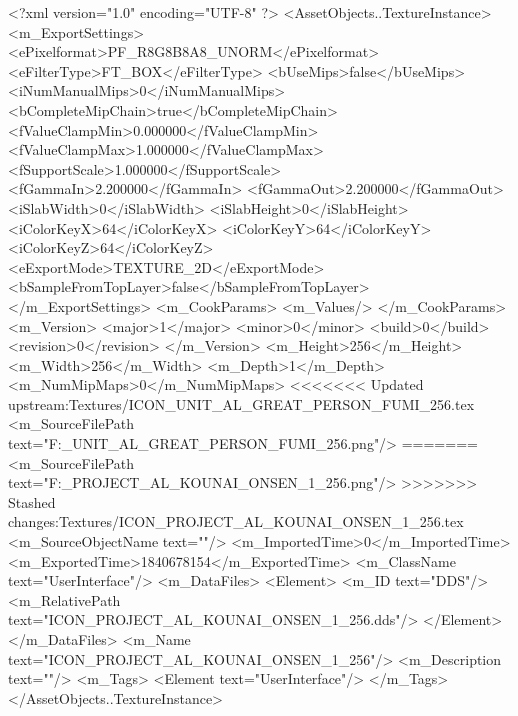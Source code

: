 <?xml version="1.0" encoding="UTF-8" ?>
<AssetObjects..TextureInstance>
	<m_ExportSettings>
		<ePixelformat>PF_R8G8B8A8_UNORM</ePixelformat>
		<eFilterType>FT_BOX</eFilterType>
		<bUseMips>false</bUseMips>
		<iNumManualMips>0</iNumManualMips>
		<bCompleteMipChain>true</bCompleteMipChain>
		<fValueClampMin>0.000000</fValueClampMin>
		<fValueClampMax>1.000000</fValueClampMax>
		<fSupportScale>1.000000</fSupportScale>
		<fGammaIn>2.200000</fGammaIn>
		<fGammaOut>2.200000</fGammaOut>
		<iSlabWidth>0</iSlabWidth>
		<iSlabHeight>0</iSlabHeight>
		<iColorKeyX>64</iColorKeyX>
		<iColorKeyY>64</iColorKeyY>
		<iColorKeyZ>64</iColorKeyZ>
		<eExportMode>TEXTURE_2D</eExportMode>
		<bSampleFromTopLayer>false</bSampleFromTopLayer>
	</m_ExportSettings>
	<m_CookParams>
		<m_Values/>
	</m_CookParams>
	<m_Version>
		<major>1</major>
		<minor>0</minor>
		<build>0</build>
		<revision>0</revision>
	</m_Version>
	<m_Height>256</m_Height>
	<m_Width>256</m_Width>
	<m_Depth>1</m_Depth>
	<m_NumMipMaps>0</m_NumMipMaps>
<<<<<<< Updated upstream:Textures/ICON_UNIT_AL_GREAT_PERSON_FUMI_256.tex
	<m_SourceFilePath text="F:\DT\lilyimages\gpportrait\ICON_UNIT_AL_GREAT_PERSON_FUMI_256.png"/>
=======
	<m_SourceFilePath text="F:\DT\lilyimages\projects\ICON_PROJECT_AL_KOUNAI_ONSEN_1_256.png"/>
>>>>>>> Stashed changes:Textures/ICON_PROJECT_AL_KOUNAI_ONSEN_1_256.tex
	<m_SourceObjectName text=""/>
	<m_ImportedTime>0</m_ImportedTime>
	<m_ExportedTime>1840678154</m_ExportedTime>
	<m_ClassName text="UserInterface"/>
	<m_DataFiles>
		<Element>
			<m_ID text="DDS"/>
			<m_RelativePath text="ICON_PROJECT_AL_KOUNAI_ONSEN_1_256.dds"/>
		</Element>
	</m_DataFiles>
	<m_Name text="ICON_PROJECT_AL_KOUNAI_ONSEN_1_256"/>
	<m_Description text=""/>
	<m_Tags>
		<Element text="UserInterface"/>
	</m_Tags>
</AssetObjects..TextureInstance>

